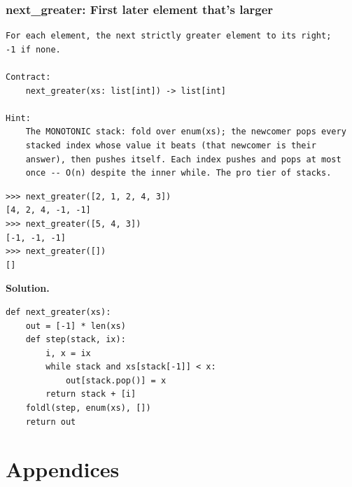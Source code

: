 \documentclass[10pt,letterpaper]{book}
\begin{document}
\section{next\_greater: First later element that's larger}
\begin{lstlisting}[style=ex]
For each element, the next strictly greater element to its right;
-1 if none.

Contract:
    next_greater(xs: list[int]) -> list[int]

Hint:
    The MONOTONIC stack: fold over enum(xs); the newcomer pops every
    stacked index whose value it beats (that newcomer is their
    answer), then pushes itself. Each index pushes and pops at most
    once -- O(n) despite the inner while. The pro tier of stacks.
\end{lstlisting}
\begin{lstlisting}[style=ex]
>>> next_greater([2, 1, 2, 4, 3])
[4, 2, 4, -1, -1]
>>> next_greater([5, 4, 3])
[-1, -1, -1]
>>> next_greater([])
[]
\end{lstlisting}
\noindent\textbf{Solution.}
\begin{lstlisting}[style=code]
def next_greater(xs):
    out = [-1] * len(xs)
    def step(stack, ix):
        i, x = ix
        while stack and xs[stack[-1]] < x:
            out[stack.pop()] = x
        return stack + [i]
    foldl(step, enum(xs), [])
    return out
\end{lstlisting}
\appendix
\part{Appendices}
\end{document}

